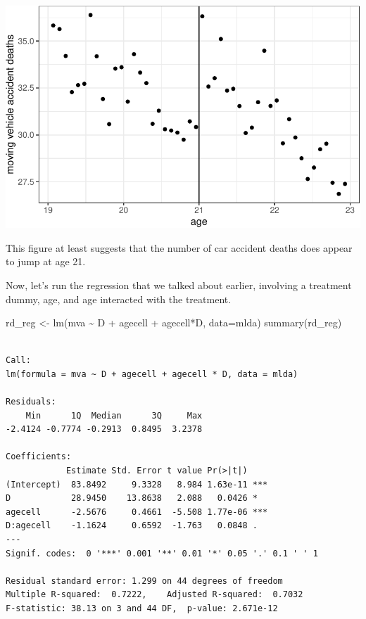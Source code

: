 \documentclass[
  letterpaper,
  DIV=11,
  numbers=noendperiod]{scrreprt}
\newenvironment{Shaded}{\begin{snugshade}}{\end{snugshade}}
\newcommand{\AttributeTok}[1]{\textcolor[rgb]{0.40,0.45,0.13}{#1}}
\newcommand{\FunctionTok}[1]{\textcolor[rgb]{0.28,0.35,0.67}{#1}}
\newcommand{\NormalTok}[1]{\textcolor[rgb]{0.00,0.23,0.31}{#1}}
\newcommand{\OtherTok}[1]{\textcolor[rgb]{0.00,0.23,0.31}{#1}}
\newcommand{\SpecialCharTok}[1]{\textcolor[rgb]{0.37,0.37,0.37}{#1}}
\begin{document}
\includegraphics{07-causal_inference_files/figure-pdf/unnamed-chunk-9-1.pdf}

This figure at least suggests that the number of car accident deaths
does appear to jump at age 21.

Now, let's run the regression that we talked about earlier, involving a
treatment dummy, age, and age interacted with the treatment.

\begin{Shaded}
\begin{Highlighting}[]
\NormalTok{rd\_reg }\OtherTok{\textless{}{-}} \FunctionTok{lm}\NormalTok{(mva }\SpecialCharTok{\textasciitilde{}}\NormalTok{ D }\SpecialCharTok{+}\NormalTok{ agecell }\SpecialCharTok{+}\NormalTok{ agecell}\SpecialCharTok{*}\NormalTok{D, }\AttributeTok{data=}\NormalTok{mlda)}
\FunctionTok{summary}\NormalTok{(rd\_reg)}
\end{Highlighting}
\end{Shaded}

\begin{verbatim}

Call:
lm(formula = mva ~ D + agecell + agecell * D, data = mlda)

Residuals:
    Min      1Q  Median      3Q     Max 
-2.4124 -0.7774 -0.2913  0.8495  3.2378 

Coefficients:
            Estimate Std. Error t value Pr(>|t|)    
(Intercept)  83.8492     9.3328   8.984 1.63e-11 ***
D            28.9450    13.8638   2.088   0.0426 *  
agecell      -2.5676     0.4661  -5.508 1.77e-06 ***
D:agecell    -1.1624     0.6592  -1.763   0.0848 .  
---
Signif. codes:  0 '***' 0.001 '**' 0.01 '*' 0.05 '.' 0.1 ' ' 1

Residual standard error: 1.299 on 44 degrees of freedom
Multiple R-squared:  0.7222,    Adjusted R-squared:  0.7032 
F-statistic: 38.13 on 3 and 44 DF,  p-value: 2.671e-12
\end{verbatim}
\end{document}
